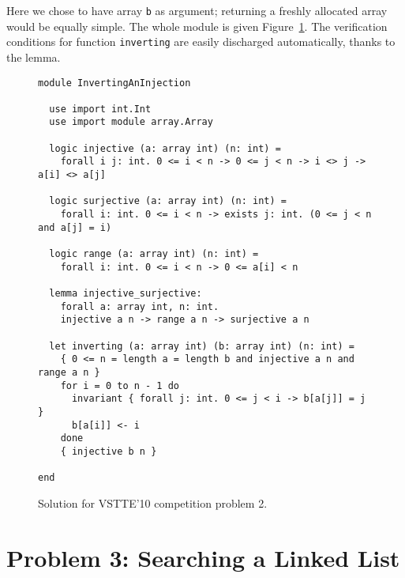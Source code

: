 Here we chose to have array \texttt{b} as argument; returning a
freshly allocated array would be equally simple.
The whole module is given Figure~\ref{fig:Inverting}.
The verification conditions for function \texttt{inverting} are easily
discharged automatically, thanks to the lemma.
\begin{figure}
  \centering
\begin{verbatim}
module InvertingAnInjection

  use import int.Int
  use import module array.Array

  logic injective (a: array int) (n: int) =
    forall i j: int. 0 <= i < n -> 0 <= j < n -> i <> j -> a[i] <> a[j]

  logic surjective (a: array int) (n: int) =
    forall i: int. 0 <= i < n -> exists j: int. (0 <= j < n and a[j] = i)

  logic range (a: array int) (n: int) =
    forall i: int. 0 <= i < n -> 0 <= a[i] < n

  lemma injective_surjective:
    forall a: array int, n: int.
    injective a n -> range a n -> surjective a n

  let inverting (a: array int) (b: array int) (n: int) =
    { 0 <= n = length a = length b and injective a n and range a n }
    for i = 0 to n - 1 do
      invariant { forall j: int. 0 <= j < i -> b[a[j]] = j }
      b[a[i]] <- i
    done
    { injective b n }

end
\end{verbatim}
\vspace*{-2em}\hrulefill
  \caption{Solution for VSTTE'10 competition problem 2.}
  \label{fig:Inverting}
\end{figure}

\section{Problem 3: Searching a Linked List}

